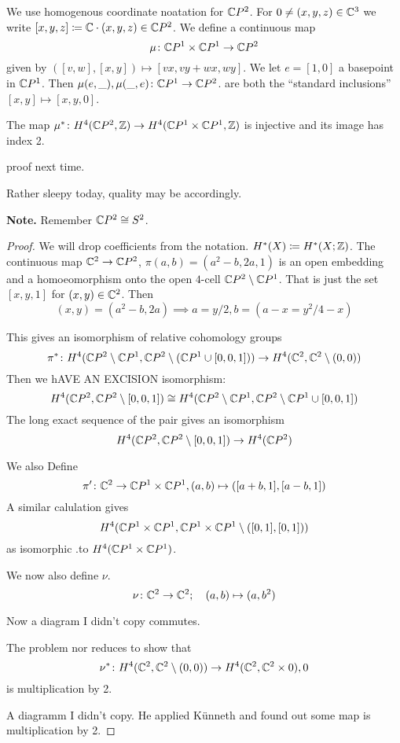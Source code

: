 \documentclass[language=english]{TemplateLecture}
\begin{document}
We use homogenous coordinate noatation for \(\mathbb{C} P ^2\). For \(0 \neq (x,y,z) \in \mathbb{C}^3\) we write \([x,y,z] \coloneq \mathbb{C} \cdot (x,y,z) \in \mathbb{C} P ^2\). We define a continuous map
\[\mu\colon \mathbb{C} P ^1 \times \mathbb{C} P^1 \to \mathbb{C} P ^2\]
given by \(([v,w] , [x,y]) \mapsto [vx, vy+wx, wy]\).
We let \(e = [1,0]\) a basepoint in \(\mathbb{C} P^1\). Then \(\mu(e, \_), \mu(\_, e) \colon \mathbb{C} P ^1 \to \mathbb{C} P ^2\).
are both the \enquote{standard inclusions} \([x,y] \mapsto [x,y,0]\).

\begin{proposition}
    The map \(\mu^* \colon H^4(\mathbb{C} P^2, \mathbb{Z}) \to H^4(\mathbb{C} P^1 \times \mathbb{C} P^1, \mathbb{Z})\) is injective and its image has index 2.
\end{proposition}

proof next time.

 Rather sleepy today, quality may be accordingly.

\textbf{Note.} Remember \(\mathbb{C} P^2 \cong S^2\).

\begin{proof}
    We will drop coefficients from the notation. \(H^*(X) \coloneq H^*(X; \mathbb{Z})\). The continuous map \(\mathbb{C}^2 \to \mathbb{C} P^2\), \(\pi(a,b) = (a^2-b, 2a, 1)\) is an open embedding and a homoeomorphism onto the open \(4\)-cell \(\mathbb{C} P^2 \setminus \mathbb{C} P^1\). That is just the set \([x,y,1]\) for \((x,y) \in \mathbb{C}^2\). Then
    \[(x,y) = (a^2 -b, 2a) \implies a = y/2, b = (a-x = y^2/4 -x)\]

    This gives an isomorphism of relative cohomology groups
    \[\pi^*\colon H^4(\mathbb{C} P^2 \setminus \mathbb{C} P ^1, \mathbb{C} P^2 \setminus (\mathbb{C} P ^1 \cup [0,0,1])) \to H^4(\mathbb{C}^2, \mathbb{C}^2\setminus (0,0))\]
    Then we hAVE AN EXCISION isomorphism:
    \[H^4(\mathbb{C} P^2, \mathbb{C} P ^2\setminus [0,0,1]) \cong H^4(\mathbb{C} P^2 \setminus \mathbb{C} P ^1, \mathbb{C} P ^2 \setminus \mathbb{C} P ^1 \cup [0,0,1])\]
    The long exact sequence of the pair gives an isomorphism
    \[H^4(\mathbb{C} P ^2, \mathbb{C} P ^2 \setminus[0,0,1]) \to H^4(\mathbb{C} P ^2)\]

    We also Define
    \[\pi'\colon \mathbb{C}^2 \to \mathbb{C} P ^1 \times \mathbb{C} P ^1, (a,b) \mapsto ([a+b, 1], [a-b,1])\]
    A similar calulation gives
    \[H^4(\mathbb{C} P ^1 \times \mathbb{C} P ^1, \mathbb{C} P^1 \times \mathbb{C} P ^1\setminus ([0,1], [0,1]))\]
    as isomorphic .to \(H^4(\mathbb{C} P ^1 \times \mathbb{C} P ^1)\).

    We now also define \(\nu\).
    \[\nu \colon \mathbb{C}^2 \to \mathbb{C} ^2 ; \quad (a,b) \mapsto (a, b^2)\]

    Now a diagram I didn't copy commutes.


    The problem nor reduces to show that
    \[\nu^*\colon H^4(\mathbb{C}^2, \mathbb{C}^2\setminus (0,0)) \to H^4(\mathbb{C}^2, \mathbb{C}^2\times 0) , 0\]
    is multiplication by 2.

    A diagramm I didn't copy. He applied Künneth and found out some map is multiplication by 2.
\end{proof}
\end{document}
